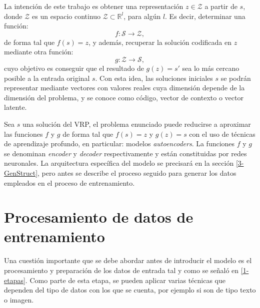  
 
 La intención de este trabajo es obtener una representación $z \in \mathcal{Z}$ a partir de $s$, donde $\mathcal{Z}$ es un espacio continuo $\mathcal{Z} \subset \mathbb{R}^{l}$, para algún $l$. Es decir, determinar una función:
 \begin{equation}
 	f: \mathcal{S} \rightarrow \mathcal{Z},
 \end{equation}
 de forma tal que $f(s) = z$, y además, recuperar la solución codificada en $z$ mediante otra función:
  \begin{equation}
  g: \mathcal{Z} \rightarrow \mathcal{S},
  \end{equation}
 cuyo objetivo es conseguir que el resultado de $g(z) = s'$ sea lo más cercano posible a la entrada original $s$. Con esta idea, las soluciones iniciales $s$ se podrán representar mediante vectores con valores reales cuya dimensión depende de la dimensión del problema, y se conoce como código, vector de contexto o vector latente. 
 
Sea $s$ una solución del VRP, el problema enunciado puede reducirse a aproximar las funciones $f$ y $g$ de forma tal que $f(s) = z$ y $g(z) = s$ con el uso de técnicas de aprendizaje profundo, en particular: modelos \textit{autoencoders}. La funciones $f$ y $g$ se denominan \textit{encoder} y \textit{decoder} respectivamente y están constituidas por redes neuronales. La arquitectura específica del modelo se precisará en la sección \ref{3-GenStruct}, pero antes se describe el proceso seguido para generar los datos empleados en el proceso de entrenamiento.


\section{Procesamiento de datos de entrenamiento}\label{dataProc}

Una cuestión importante que se debe abordar antes de introducir el modelo es el procesamiento y preparación de los datos de entrada tal y como se señaló en \ref{1-etapas}. Como parte de esta etapa, se pueden aplicar varias técnicas que dependen del tipo de datos con los que se cuenta, por ejemplo si son de tipo texto o imagen. 



